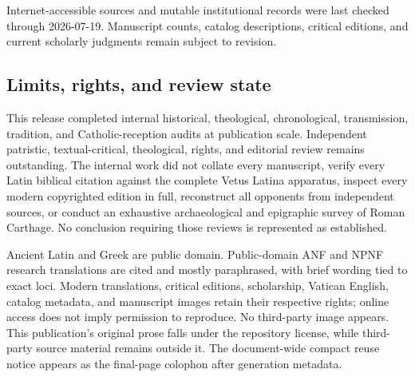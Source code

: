 Internet-accessible sources and mutable institutional records were last checked
through 2026-07-19. Manuscript counts, catalog descriptions, critical editions,
and current scholarly judgments remain subject to revision.

\subsection{Limits, rights, and review state}

This release completed internal historical, theological, chronological,
transmission, tradition, and Catholic-reception audits at publication scale.
Independent patristic, textual-critical, theological, rights, and editorial
review remains outstanding. The internal work did not collate every manuscript,
verify every Latin biblical citation against the complete Vetus Latina
apparatus, inspect every modern copyrighted edition in full, reconstruct all
opponents from independent sources, or conduct an exhaustive archaeological
and epigraphic survey of Roman Carthage. No conclusion requiring those reviews
is represented as established.

Ancient Latin and Greek are public domain. Public-domain ANF and NPNF research
translations are cited and mostly paraphrased, with brief wording tied to exact
loci. Modern translations, critical editions, scholarship, Vatican English,
catalog metadata, and manuscript images retain their respective rights; online
access does not imply permission to reproduce. No third-party image appears.
This publication's original prose falls under the repository license, while
third-party source material remains outside it. The document-wide compact
reuse notice appears as the final-page colophon after generation metadata.
